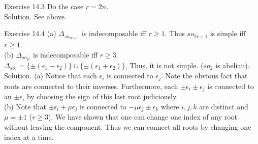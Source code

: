 \documentclass[11pt]{article}
\begin{document}
Exercise 14.3  Do the case $r=2n$. \\
Solution.  See above.    

Exercise 14.4 (a) $\Delta_{so_{2r+1}}$ is indecomposable iff $r\geq 1$.  Thus $so_{2r+1}$ is simple iff $r\geq 1$.  \\
(b) $\Delta_{so_{2r}}$ is indecomposable iff $r\geq 3$. \\
$\Delta_{so_4}=\{\pm (\epsilon_1-\epsilon_2) \} \cup \{\pm (\epsilon_1+\epsilon_2 )\} $, Thus, it is not simple.  ($so_2$ is abelian). \\
Solution.  (a) Notice that each $\epsilon_i$ is connected to $\epsilon_j$.  Note the obvious fact that roots are connected to their inverses. Furthermore, each $\pm \epsilon_i \pm \epsilon_j$ is connected to an $\pm \epsilon_i$ by choosing the sign of this last root judiciously. \\
(b) Note that $\pm \epsilon_i + \mu \epsilon_j$ is connected to $-\mu \epsilon_j \pm \epsilon_k$ where $i, j, k$ are distinct and $\mu =\pm 1$ ($r \geq 3$). We have shown that one can change one index of any root without leaving the component.  Thus we can connect all roots by changing one index at a time.     
         
 
\end{document}
